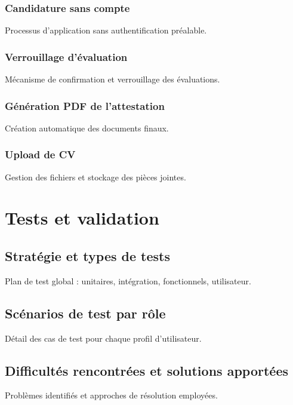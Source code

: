\documentclass[14pt,a4paper]{article}
\begin{document}
\subsubsection{Candidature sans compte}
\hspace{.8cm} Processus d'application sans authentification préalable.

\subsubsection{Verrouillage d'évaluation}
\hspace{.8cm} Mécanisme de confirmation et verrouillage des évaluations.

\subsubsection{Génération PDF de l'attestation}
\hspace{.8cm} Création automatique des documents finaux.

\subsubsection{Upload de CV}
\hspace{.8cm} Gestion des fichiers et stockage des pièces jointes.

\newpage
\section{Tests et validation}

\subsection{Stratégie et types de tests}
\hspace{.8cm} Plan de test global : unitaires, intégration, fonctionnels, utilisateur.

\subsection{Scénarios de test par rôle}
\hspace{.8cm} Détail des cas de test pour chaque profil d'utilisateur.

\subsection{Difficultés rencontrées et solutions apportées}
\hspace{.8cm} Problèmes identifiés et approches de résolution employées.
\end{document}
